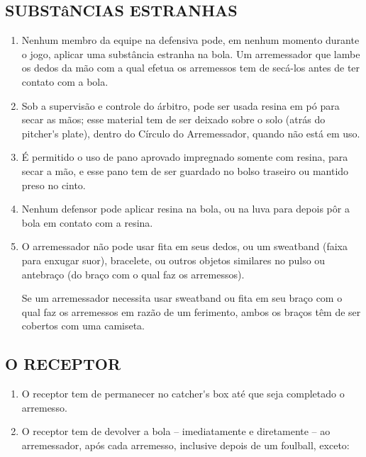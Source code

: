 \begin{multicols}{2}
	\subsection{SUBST\^aNCIAS ESTRANHAS} 
	
	\begin{enumerate}[label=\alph*)]
		\item Nenhum membro da equipe na defensiva pode, em nenhum momento durante o jogo, aplicar uma subst\^ancia estranha na bola. Um arremessador que lambe os dedos da m\~ao com a qual efetua os arremessos tem de sec\'a-los antes de ter contato com a bola. 
		
		\item  Sob a supervis\~ao e controle do \'arbitro, pode ser usada resina em p\'o para secar as m\~aos; esse material tem de ser deixado sobre o solo (atr\'as do \gls{pitcher's plate}), dentro do C\'irculo do Arremessador, quando n\~ao est\'a em uso. 
		
		\item  \'E permitido o uso de pano aprovado impregnado somente com resina, para secar a m\~ao, e esse pano tem de ser guardado no bolso traseiro ou mantido preso no cinto. 
		
		\item  Nenhum defensor pode aplicar resina na bola, ou na luva para depois pôr a bola em contato com a resina. 
		
		\item  O arremessador n\~ao pode usar fita em seus dedos, ou um \gls{sweatband} (faixa para enxugar suor), bracelete, ou outros objetos similares no pulso ou antebra\c{c}o (do bra\c{c}o com o qual faz os arremessos). 
		
		Se um arremessador necessita usar \gls{sweatband} ou fita em seu bra\c{c}o com o qual faz os arremessos em raz\~ao de um ferimento, ambos os bra\c{c}os t\^em de ser cobertos com uma camiseta. 
	\end{enumerate}
	
	\subsection{O RECEPTOR}
	
	\begin{enumerate}[label=\alph*)]
		\item O receptor tem de permanecer no \gls{catcher's box} at\'e que seja completado o arremesso. 
		
		\item  O receptor tem de devolver a bola -- imediatamente e diretamente -- ao arremessador, ap\'os cada arremesso, inclusive depois de um \gls{foulball}, exceto: 
		

\end{enumerate}
\end{multicols}
